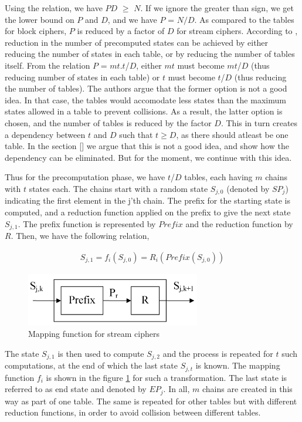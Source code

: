 Using the relation, we have $PD$ $\geq$ $N$. If we ignore the greater than sign, we get the lower bound on $P$ and $D$, and we have $P$ = $N/D$. As compared to the tables for block ciphers, $P$ is reduced by a factor of $D$ for stream ciphers. According to \cite{biryukov2000ctm}, reduction in the number of precomputed states can be achieved by either reducing the number of states in each table, or by reducing the number of tables itself. From the relation $P$ = $mt$.$t$/$D$, either $mt$ must become $mt$/$D$ (thus reducing number of states in each table) or $t$ must become $t$/$D$ (thus reducing the number of tables). The authors argue that the former option is not a good idea. In that case, the tables would accomodate less states than the maximum states allowed in a table to prevent collisions. As a result, the latter option is chosen, and the number of tables is reduced by the factor $D$. This in turn creates a dependency between $t$ and $D$ such that $t \geq D$, as there should atleast be one table. In the section \ref{} we argue that this is not a good idea, and show how the dependency can be eliminated. But for the moment, we continue with this idea. 

Thus for the precomputation phase, we have $t$/$D$ tables, each having $m$ chains with $t$ states each. The chains start with a random state $S_{j,0}$ (denoted by $SP_j$) indicating the first element in the j'th chain. The prefix for the starting state is computed, and a reduction function applied on the prefix to give the next state $S_{j,1}$. The prefix function is represented by $Prefix$ and the reduction function by $R$. Then, we have the following relation,

\begin{align*}
S_{j,1} = f_i(S_{j,0}) = R_i(Prefix(S_{j,0}))
\end{align*}  

\begin{figure}[ht!]
	\centering
		\includegraphics[width=3in]{./figures/mapping-function-stream.PNG}
	\caption{Mapping function for stream ciphers}	
	\label{fig:mapping-function-stream}
\end{figure}

The state $S_{j,1}$ is then used to compute $S_{j,2}$ and the process is repeated for $t$ such computations, at the end of which the last state $S_{j,t}$ is known. The mapping function $f_i$ is shown in the figure \ref{fig:mapping-function-stream} for such a transformation. The last state is referred to as end state and denoted by $EP_j$. In all, $m$ chains are created in this way as part of one table. The same is repeated for other tables but with different reduction functions, in order to avoid collision between different tables. 

